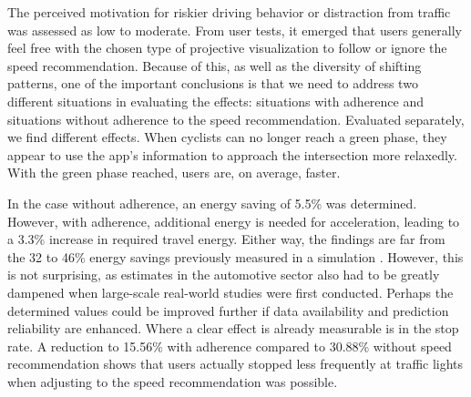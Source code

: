 The perceived motivation for riskier driving behavior or distraction from traffic was assessed as low to moderate. From user tests, it emerged that users generally feel free with the chosen type of projective visualization to follow or ignore the speed recommendation. Because of this, as well as the diversity of shifting patterns, one of the important conclusions is that we need to address two different situations in evaluating the effects: situations with adherence and situations without adherence to the speed recommendation. Evaluated separately, we find different effects. When cyclists can no longer reach a green phase, they appear to use the app's information to approach the intersection more relaxedly. With the green phase reached, users are, on average, faster.

In the case without adherence, an energy saving of 5.5\% was determined. However, with adherence, additional energy is needed for acceleration, leading to a 3.3\% increase in required travel energy. Either way, the findings are far from the 32 to 46\% energy savings previously measured in a simulation \cite{tal_vehicular-communications-based_2016}. However, this is not surprising, as estimates in the automotive sector also had to be greatly dampened when large-scale real-world studies were first conducted. Perhaps the determined values could be improved further if data availability and prediction reliability are enhanced. Where a clear effect is already measurable is in the stop rate. A reduction to 15.56\% with adherence compared to 30.88\% without speed recommendation shows that users actually stopped less frequently at traffic lights when adjusting to the speed recommendation was possible.
